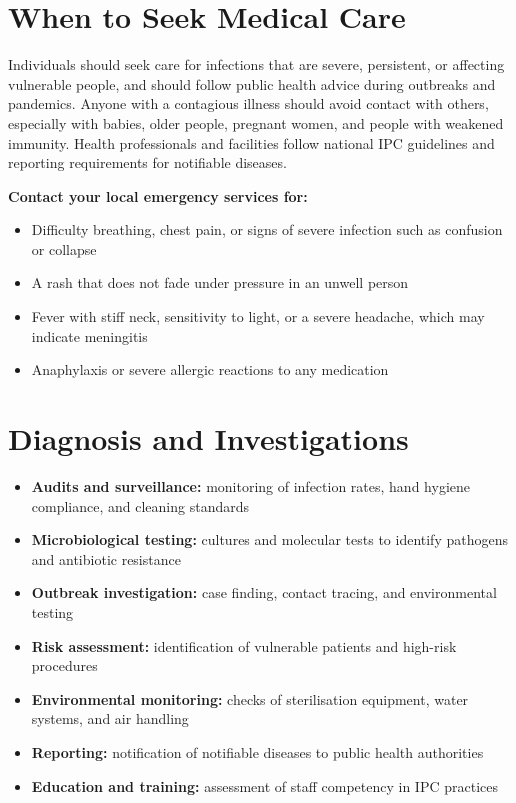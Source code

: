 \section*{When to Seek Medical Care}
Individuals should seek care for infections that are severe, persistent, or affecting vulnerable people, and should follow public health advice during outbreaks and pandemics. Anyone with a contagious illness should avoid contact with others, especially with babies, older people, pregnant women, and people with weakened immunity. Health professionals and facilities follow national IPC guidelines and reporting requirements for notifiable diseases.

\textbf{Contact your local emergency services for:}
\begin{itemize}
    \item Difficulty breathing, chest pain, or signs of severe infection such as confusion or collapse
    \item A rash that does not fade under pressure in an unwell person
    \item Fever with stiff neck, sensitivity to light, or a severe headache, which may indicate meningitis
    \item Anaphylaxis or severe allergic reactions to any medication
\end{itemize}

\section*{Diagnosis and Investigations}
\begin{itemize}
    \item \textbf{Audits and surveillance:} monitoring of infection rates, hand hygiene compliance, and cleaning standards
    \item \textbf{Microbiological testing:} cultures and molecular tests to identify pathogens and antibiotic resistance
    \item \textbf{Outbreak investigation:} case finding, contact tracing, and environmental testing
    \item \textbf{Risk assessment:} identification of vulnerable patients and high-risk procedures
    \item \textbf{Environmental monitoring:} checks of sterilisation equipment, water systems, and air handling
    \item \textbf{Reporting:} notification of notifiable diseases to public health authorities
    \item \textbf{Education and training:} assessment of staff competency in IPC practices
\end{itemize}

